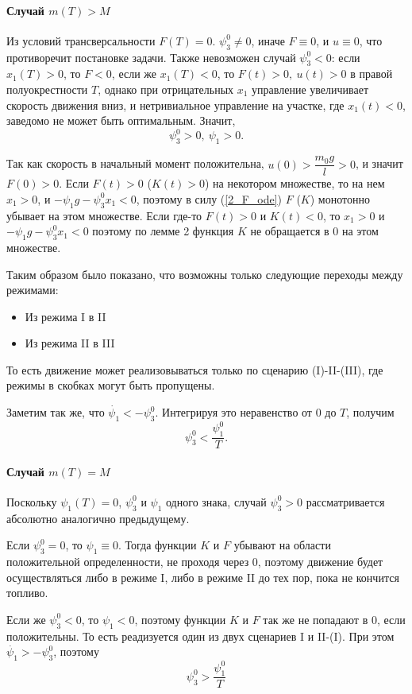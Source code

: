 \documentclass[16pt]{article}
\begin{document}
\paragraph{Случай $m(T) > M$}
Из условий трансверсальности $F(T) = 0$. $\psi_3^0 \not= 0$, иначе $F \equiv 0$, и $u \equiv 0$, что противоречит
постановке задачи. Также невозможен случай $\psi_3^0 < 0$: если $x_1(T) > 0$, то $F < 0$, если же $x_1(T) < 0$, то
$F(t) > 0,\ u(t) > 0$ в правой полуокрестности $T$, однако при отрицательных $x_1$ управление увеличивает скорость
движения вниз, и нетривиальное управление на участке, где $x_1(t) < 0$, заведомо не может быть оптимальным.
Значит, $$\psi_3^0 > 0, \ \psi_1 > 0.$$

Так как скорость в начальный момент положительна, $u(0) > \dfrac{m_0g}{l} > 0$, и значит $F(0) > 0$.
Если $F(t) > 0$ ($K(t) > 0$) на некотором множестве, то на нем $x_1 > 0$, и $-\psi_1g-\psi_3^0x_1 < 0$,
поэтому в силу (\ref{2_F_ode}) $F$ ($K$) монотонно убывает на этом множестве. Если где-то $F(t) > 0$ и $K(t) < 0$,
то $x_1 > 0$ и $-\psi_1g-\psi_3^0x_1 < 0$ поэтому по лемме 2 функция $K$ не обращается в 0 на этом множестве.

Таким образом было показано, что возможны только следующие переходы между режимами: 
\begin{itemize}
\item
Из режима I в II
\item
Из режима II в III
\end{itemize}

То есть движение может реализовываться только по сценарию (I)-II-(III), где режимы в скобках могут быть пропущены.

Заметим так же, что $\dot{\psi_1} < -\psi_3^0$. Интегрируя это неравенство от 0 до $T$, получим
$$\psi_3^0 < \dfrac{\psi_1^0}{T}.$$
 
\paragraph{Случай $m(T) = M$}
Поскольку $\psi_1(T) = 0$, $\psi_3^0$ и $\psi_1$ одного знака, случай $\psi_3^0 > 0$ рассматривается абсолютно
аналогично предыдущему.

Если $\psi_3^0 = 0$, то $\psi_1 \equiv 0$. Тогда функции $K$ и $F$ убывают на области положительной определенности, не
проходя через 0, поэтому движение будет осуществляться либо в режиме I, либо в режиме II до тех пор, пока не 
кончится топливо.

Если же $\psi_3^0 < 0$, то $\psi_1 < 0$, поэтому функции $K$ и $F$ так же не попадают в 0, если положительны. То 
есть реадизуется один из двух сценариев I и II-(I).  При этом $\dot{\psi_1} > -\psi_3^0$, поэтому 
$$\psi_3^0 > \dfrac{\psi_1^0}{T}$$
\end{document}
